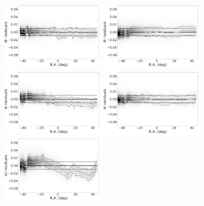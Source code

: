 \documentclass[fleqn,usenatbib]{mnras}
\begin{document}
\begin{figure}
    \centering\includegraphics[width=0.45\textwidth]{figures/colorResidDES42bright_dr_RA_Hess_lr.png}
    \centering\includegraphics[width=0.45\textwidth]{figures/colorResidPSDR2v42bright_dr_RA_Hess_lr.png}
    \centering\includegraphics[width=0.45\textwidth]{figures/colorResidDES42bright_di_RA_Hess_lr.png}
    \centering\includegraphics[width=0.45\textwidth]{figures/colorResidPSDR2v42bright_di_RA_Hess_lr.png}
    \centering\includegraphics[width=0.45\textwidth]{figures/colorResidDES42bright_dz_RA_Hess_lr.png}

\end{figure}
\end{document}
